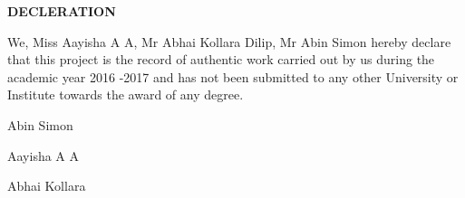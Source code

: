 \vspace{2in}

\centerline{\large{\bfseries{DECLERATION}}}

\hspace{1in}

\normalsize
We, Miss Aayisha A A, Mr Abhai Kollara Dilip, Mr Abin Simon hereby declare that this project is the record of authentic work carried out by us during the academic year 2016 -2017 and has not been submitted to any other University or Institute towards the award of any degree.

\vspace{5em}

\begin{minipage}[b]{0.33333\textwidth}
\raggedright
Abin Simon
\end{minipage}%
\begin{minipage}[b]{0.33333\textwidth}
\centering
Aayisha A A
\end{minipage}%
\begin{minipage}[b]{0.33333\textwidth}
\raggedleft
Abhai Kollara
\end{minipage}
